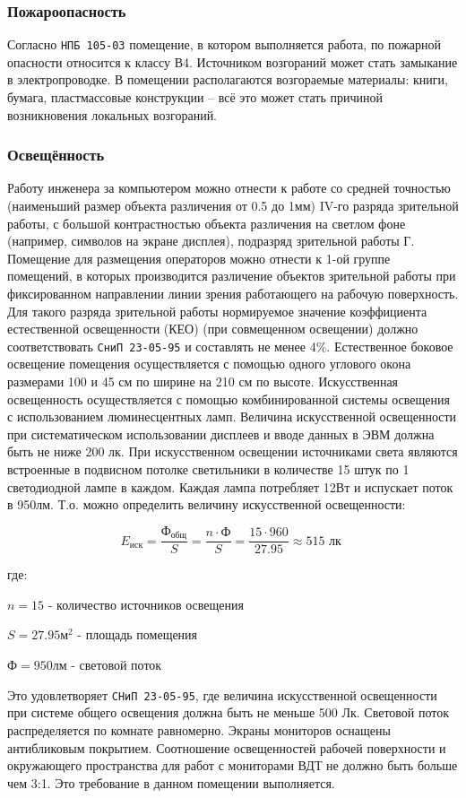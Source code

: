 \subsubsection{Пожароопасность}
Согласно \verb|НПБ 105-03| помещение, в котором выполняется работа,
по пожарной опасности относится к классу В4. Источником возгораний
может стать замыкание в электропроводке. В помещении располагаются
возгораемые материалы: книги, бумага, пластмассовые конструкции --
всё это может стать причиной возникновения локальных возгораний. 

\subsubsection{Освещённость}
Работу инженера за компьютером можно отнести к работе со средней
точностью (наименьший размер объекта различения от 0.5 до 1мм)
IV-го разряда зрительной работы, с большой контрастностью объекта
различения на светлом фоне (например, символов на экране дисплея),
подразряд зрительной работы Г. Помещение для размещения операторов
можно отнести к 1-ой группе помещений, в которых производится
различение объектов зрительной работы при фиксированном направлении
линии зрения работающего на рабочую поверхность. Для такого разряда
зрительной работы нормируемое значение коэффициента естественной
освещенности (КЕО) (при совмещенном освещении) должно соответствовать
\verb|СниП 23-05-95| и составлять не менее 4\%.
Естественное боковое освещение помещения осуществляется с
помощью одного углового окона размерами 100 и 45 см по ширине на 210 см по высоте.
Искусственная освещенность осуществляется с помощью комбинированной системы
освещения с использованием люминесцентных ламп. Величина искусственной
освещенности при систематическом использовании дисплеев и вводе
данных в ЭВМ должна быть не ниже 200 лк.
При искусственном освещении источниками света являются встроенные
в подвисном потолке светильники в количестве 15 штук по 1 светодиодной
лампе в каждом. Каждая лампа потребляет 12Вт и испускает поток в 950лм.
Т.о. можно определить величину искусственной освещенности:

$$ E_\text{иск} = \frac{\text{Ф}_\text{общ}}{S} = \frac{n \cdot \text{Ф}}{S} =
\frac{15 \cdot 960}{27.95} \approx 515 \text{ лк } $$

где: 
\begin{mintemize}
    \item $n = 15$ - количество источников освещения
    \item $S = 27.95 \text{м}^2$ - площадь помещения
    \item $\text{Ф} = 950 \text{лм}$ - световой поток
\end{mintemize}

Это удовлетворяет \verb|СНиП 23-05-95|, где величина искусственной
освещенности при системе общего освещения должна быть не меньше 500 Лк.
Световой поток распределяется по комнате равномерно. Экраны мониторов
оснащены антибликовым покрытием. Соотношение освещенностей рабочей
поверхности и окружающего пространства для работ с мониторами ВДТ
не должно быть больше чем 3:1. Это требование в данном помещении выполняется.
